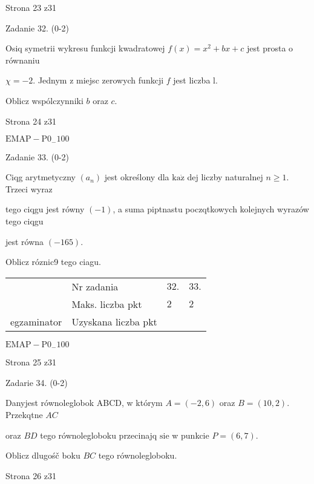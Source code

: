 \documentclass[a4paper,12pt]{article}
\begin{document}
Strona 23 z31





Zadanie 32. (0-2)

Osiq symetrii wykresu funkcji kwadratowej $f(x)=x^{2}+bx+c$ jest prosta o równaniu

$\chi=-2$. Jednym z miejsc zerowych funkcji $f$ jest liczba l.

Oblicz wspólczynniki $b$ oraz $c.$

Strona 24 z31

$\mathrm{E}\mathrm{M}\mathrm{A}\mathrm{P}-\mathrm{P}0_{-}100$





Zadanie 33. (0-2)

Ciqg arytmetyczny $(a_{n})$ jest określony dla $\mathrm{k}\mathrm{a}\dot{\mathrm{z}}$ dej liczby naturalnej $n\geq 1$. Trzeci wyraz

tego ciqgu jest równy $(-1)$, a suma piptnastu poczqtkowych kolejnych wyrazów tego ciqgu

jest równa $(-165).$

Oblicz róznic9 tego ciagu.
\begin{center}
\begin{tabular}{|l|l|l|l|}
\cline{2-4}
&	\multicolumn{1}{|l|}{Nr zadania}&	\multicolumn{1}{|l|}{$32.$}&	\multicolumn{1}{|l|}{ $33.$}	\\
\cline{2-4}
&	\multicolumn{1}{|l|}{Maks. liczba pkt}&	\multicolumn{1}{|l|}{$2$}&	\multicolumn{1}{|l|}{ $2$}	\\
\cline{2-4}
\multicolumn{1}{|l|}{egzaminator}&	\multicolumn{1}{|l|}{Uzyskana liczba pkt}&	\multicolumn{1}{|l|}{}&	\multicolumn{1}{|l|}{}	\\
\hline
\end{tabular}

\end{center}
$\mathrm{E}\mathrm{M}\mathrm{A}\mathrm{P}-\mathrm{P}0_{-}100$

Strona 25 z31





Zadarie 34. (0-2)

Danyjest równoleglobok ABCD, w którym $A=(-2,6)$ oraz $B=(10,2)$. Przekqtne $AC$

oraz $BD$ tego równolegloboku przecinajq $\mathrm{s}\mathrm{i}\mathrm{e}$ w punkcie $P=(6,7).$

Oblicz dlugośč boku $BC$ tego równolegloboku.

Strona 26 z31
\end{document}
